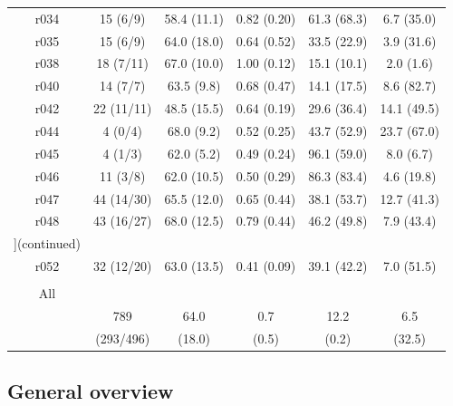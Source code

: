 \documentclass[phd,tocprelim]{cornell}
\renewcommand{\caption}[1]{\singlespacing\hangcaption{#1}\normalspacing}
\begin{document}
\begin{longtable}{c|c|c|c|c|c}
r034 & 15 (6/9) & 58.4 (11.1) & 0.82 (0.20) & 61.3 (68.3) & 6.7 (35.0)  \\
r035 & 15 (6/9) & 64.0 (18.0) & 0.64 (0.52) & 33.5 (22.9) & 3.9 (31.6)  \\
r038 & 18 (7/11) & 67.0 (10.0) & 1.00 (0.12) & 15.1 (10.1) & 2.0 (1.6)  \\
r040 & 14 (7/7) & 63.5 (9.8) & 0.68 (0.47) & 14.1 (17.5) & 8.6 (82.7)  \\
r042 & 22 (11/11) & 48.5 (15.5) & 0.64 (0.19) & 29.6 (36.4) & 14.1 (49.5)  \\
r044 & 4 (0/4) & 68.0 (9.2) & 0.52 (0.25) & 43.7 (52.9) & 23.7 (67.0)  \\
r045 & 4 (1/3) & 62.0 (5.2) & 0.49 (0.24) & 96.1 (59.0) & 8.0 (6.7)  \\
r046 & 11 (3/8) & 62.0 (10.5) & 0.50 (0.29) & 86.3 (83.4) & 4.6 (19.8)  \\
r047 & 44 (14/30) & 65.5 (12.0) & 0.65 (0.44) & 38.1 (53.7) & 12.7 (41.3)  \\
r048 & 43 (16/27) & 68.0 (12.5) & 0.79 (0.44) & 46.2 (49.8) & 7.9 (43.4)  \\
 \caption[]{(continued)}\\

r052 & 32 (12/20) & 63.0 (13.5) & 0.41 (0.09) & 39.1 (42.2) & 7.0 (51.5)  \\

   & & & & & \\
 All  & & & & & \\
\hline\hline
& 789  & 64.0 & 0.7 & 12.2 & 6.5 \\
&(293/496) &(18.0) & (0.5) &(0.2) &  (32.5)  \\

\bottomrule
\end{longtable}

\doublespacing

\subsection{General overview}
\end{document}
